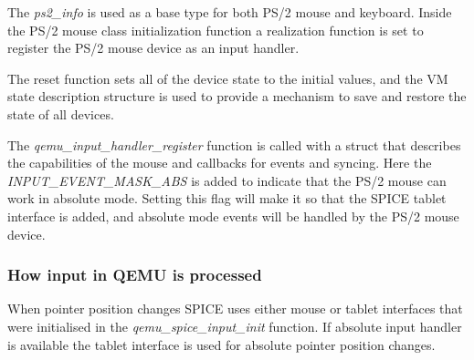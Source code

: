 \begin{codeblock}
    
\end{codeblock}

The \emph{ps2\_info} is used as a base type for both PS/2 mouse and keyboard.
Inside the PS/2 mouse class initialization function a realization function is
set to register the PS/2 mouse device as an input handler.

\begin{codeblock}
    
\end{codeblock}

\noindent
The reset function sets all of the device state to the initial values, and the
VM state description structure is used to provide a mechanism to save and
restore the state of all devices.

The \emph{qemu\_input\_handler\_register} function is called with a struct that
describes the capabilities of the mouse and callbacks for events and syncing.
Here the \emph{INPUT\_EVENT\_MASK\_ABS} is added to indicate that the PS/2 mouse
can work in absolute mode.  Setting this flag will make it so that the SPICE
tablet interface is added, and absolute mode events will be handled by the PS/2
mouse device.

\begin{codeblock}
    
\end{codeblock}

\subsubsection{How input in QEMU is processed}

When pointer position changes SPICE uses either mouse or tablet interfaces that
were initialised in the \emph{qemu\_spice\_input\_init} function.  If absolute
input handler is available the tablet interface is used for absolute pointer
position changes.

\begin{codeblock}
    
\end{codeblock}

